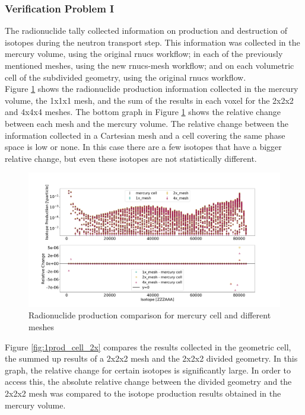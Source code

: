 \subsubsection{Verification Problem I}
The radionuclide tally collected information on production and destruction of
isotopes during the neutron transport step. This information was collected
in the mercury volume, using the original rnucs workflow; in each of the previously
mentioned meshes, using the new rnucs-mesh workflow; and on each
volumetric cell of the subdivided geometry, using the original rnucs
workflow.\\
Figure \ref{fig:1prod_cell_1x_2x_4x} shows the radionuclide production information
collected in the mercury volume, the 1x1x1 mesh, and the sum of the results in
each voxel for the 2x2x2 and 4x4x4 meshes. The bottom graph in Figure
\ref{fig:1prod_cell_1x_2x_4x} shows the relative change between each mesh and the
mercury volume.
The relative change between the information collected in a Cartesian mesh and a cell
covering the same phase space is low or none. In this case there are a few isotopes that
have a bigger relative change, but even these isotopes are not statistically different.
%
\begin{figure}[H]
	\centering
	\includegraphics[scale=0.42,trim={2cm 1cm 3cm 2cm},clip]{../figs/toy_p1/prod_VPI_1x_2x_4x.pdf}
	\caption{Radionuclide production comparison for mercury cell and different meshes}
	\label{fig:1prod_cell_1x_2x_4x}
\end{figure}
%
Figure \ref{fig:1prod_cell_2x} compares the results collected in the geometric
cell, the summed up results of a 2x2x2 mesh and the 2x2x2 divided geometry. In
this graph, the relative change for certain isotopes is significantly large.
In order to access this, the absolute
relative change between the divided geometry and the 2x2x2 mesh was compared
to the isotope production results obtained in the mercury volume.
